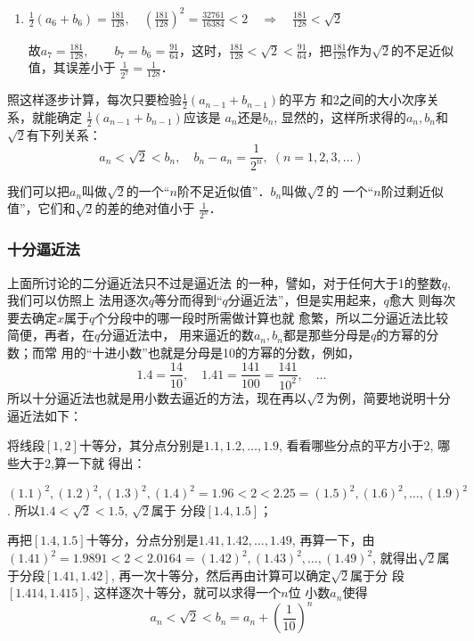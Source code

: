 \begin{enumerate}
     故$a_{6}=a_{5}=\frac{45}{32}, \qquad b_{6}=\frac{91}{64}
    $

    
    \item  $\frac{1}{2}\left(a_{6}+b_{6}\right)=\frac{181}{128},\quad \left(\frac{181}{128}\right)^{2}=\frac{32761}{16384}<2 \quad\Rightarrow\quad \frac{181}{128}<\sqrt{2}$
    
     故$a_{7}=\frac{181}{128}, \qquad b_{7}=b_{6}=\frac{91}{64}$，这时，$\frac{181}{128}<\sqrt{2}<\frac{91}{64}$，把$\frac{181}{128}$作为$\sqrt{2}$的不足近似值，其误差小于
$\frac{1}{2^7}=\frac{1}{128}$．
\end{enumerate}

照这样逐步计算，每次只要检验$\frac{1}{2}(a_{n-1}+b_{n-1})$的平方
和2之间的大小次序关系，就能确定
$\frac{1}{2}(a_{n-1}+b_{n-1})$应该是
$a_n$还是$b_n$, 显然的，这样所求得的$a_n,b_n$和$\sqrt{2}$有下列关系：
\[a_n<\sqrt{2}<b_n,\quad b_n-a_n=\frac{1}{2^n},\; (n=1,2,3,\ldots)\]

我们可以把$a_n$叫做$\sqrt{2}$的一个“$n$阶不足近似值”．$b_n$叫做$\sqrt{2}$的
一个“$n$阶过剩近似值”，它们和$\sqrt{2}$的差的绝对值小于
$\frac{1}{2^n}$．


\subsubsection{十分逼近法}

上面所讨论的二分逼近法只不过是逼近法
的一种，譬如，对于任何大于1的整数$q$, 我们可以仿照上
法用逐次$q$等分而得到“$q$分逼近法”，但是实用起来，$q$愈大
则每次要去确定$x$属于$q$个分段中的哪一段时所需做计算也就
愈繁，所以二分逼近法比较简便，再者，在$q$分逼近法中，
用来逼近的数$a_n,b_n$都是那些分母是$q$的方幂的分数；而常
用的“十进小数”也就是分母是10的方幂的分数，例如，
\[1.4=\frac{14}{10},\quad  1.41=\frac{141}{100}=\frac{141}{10^2},\quad \ldots \]
所以十分逼近法也就是用小数去逼近的方法，现在再以$\sqrt{2}$为例，简要地说明十分逼近法如下：

将线段$[1,2]$十等分，其分点分别是$1.1,1.2,\ldots,
1.9$, 看看哪些分点的平方小于2, 哪些大于2,算一下就
得出：

$(1.1)^2,(1.2)^2,(1.3)^2,(1.4)^2=1.96<2<2.25=
(1.5)^2,(1.6)^2,\ldots ,(1.9)^2$. 所以$1.4<\sqrt{2}<1.5$, $\sqrt{2}$属于
分段$[1.4,1.5]$；

再把$[1.4,1.5]$十等分，分点分别是$1.41,1.42,\ldots,
1.49$, 再算一下，由$(1.41)^2=1.9891<2<2.0164=
(1.42)^2,(1.43)^2,\ldots,(1.49)^2$, 就得出$\sqrt{2}$属于分段$[1.41,1.42]$, 再一次十等分，然后再由计算可以确定$\sqrt{2}$属于分
段$[1.414,1.415]$, 这样逐次十等分，就可以求得一个$n$位
小数$a_n$使得
\[a_n<\sqrt{2}<b_n=a_n+\left(\frac{1}{10}\right)^n\]


